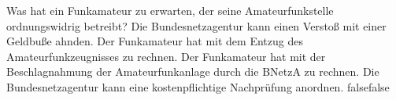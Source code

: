     {Was hat ein Funkamateur zu erwarten, der seine Amateurfunkstelle ordnungswidrig betreibt?}
    {Die Bundesnetzagentur kann einen Verstoß mit einer Geldbuße ahnden.}
    {Der Funkamateur hat mit dem Entzug des Amateurfunkzeugnisses zu rechnen.}
    {Der Funkamateur hat mit der Beschlagnahmung der Amateurfunkanlage durch die BNetzA zu rechnen.}
    {Die Bundesnetzagentur kann eine kostenpflichtige Nachprüfung anordnen.}
    {false}{false}